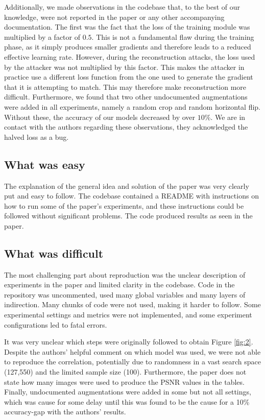 Additionally, we made observations in the codebase that, to the best of our knowledge, were not reported in the paper or any other accompanying documentation. The first was the fact that the loss of the training module was multiplied by a factor of $0.5$. This is not a fundamental flaw during the training phase, as it simply produces smaller gradients and therefore leads to a reduced effective learning rate. However, during the reconstruction attacks, the loss used by the attacker was not multiplied by this factor. This makes the attacker in practice use a different loss function from the one used to generate the gradient that it is attempting to match. This may therefore make reconstruction more difficult. Furthermore, we found that two other undocumented augmentations were added in all experiments, namely a random crop and random horizontal flip. Without these, the accuracy of our models decreased by over $10\%$. We are in contact with the authors regarding these observations, they acknowledged the halved loss as a bug.

\subsection{What was easy}

The explanation of the general idea and solution of the paper was very clearly put and easy to follow. The codebase contained a README with instructions on how to run some of the paper's experiments, and these instructions could be followed without significant problems. The code produced results as seen in the paper.

\subsection{What was difficult}

The most challenging part about reproduction was the unclear description of experiments in the paper and limited clarity in the codebase. Code in the repository was uncommented, used many global variables and many layers of indirection. Many chunks of code were not used, making it harder to follow. Some experimental settings and metrics were not implemented, and some experiment configurations led to fatal errors.

It was very unclear which steps were originally followed to obtain Figure \ref{fig:2}. Despite the authors' helpful comment on which model was used, we were not able to reproduce the correlation, potentially due to randomness in a vast search space (127,550) and the limited sample size (100). Furthermore, the paper does not state how many images were used to produce the PSNR values in the tables. Finally, undocumented augmentations were added in some but not all settings, which was cause for some delay until this was found to be the cause for a 10\% accuracy-gap with the authors' results.

